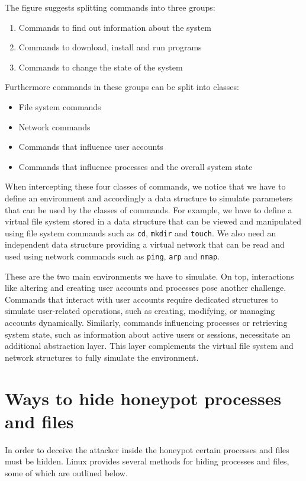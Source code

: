The figure suggests splitting commands into three groups: 
\begin{enumerate}
    \item Commands to find out information about the system
    \item Commands to download, install and run programs
    \item Commands to change the state of the system
\end{enumerate}

Furthermore commands in these groups can be split into classes:
\begin{itemize}
    \item File system commands
    \item Network commands
    \item Commands that influence user accounts
    \item Commands that influence processes and the overall system state
\end{itemize}

When intercepting these four classes of commands, we notice that we have to define an environment and accordingly a data structure to simulate parameters that can be used by the classes of commands. For example, we have to define a virtual file system stored in a data structure that can be viewed and manipulated using file system commands such as \texttt{cd}, \texttt{mkdir} and \texttt{touch}. We also need an independent data structure providing a virtual network that can be read and used using network commands such as \texttt{ping}, \texttt{arp} and \texttt{nmap}.

These are the two main environments we have to simulate. On top, interactions like altering and creating user accounts and processes pose another challenge. Commands that interact with user accounts require dedicated structures to simulate user-related operations, such as creating, modifying, or managing accounts dynamically. Similarly, commands influencing processes or retrieving system state, such as information about active users or sessions, necessitate an additional abstraction layer. This layer complements the virtual file system and network structures to fully simulate the environment.

\section{Ways to hide honeypot processes and files}
In order to deceive the attacker inside the honeypot certain processes and files must be hidden. 
Linux provides several methods for hiding processes and files, some of which are outlined below. 

